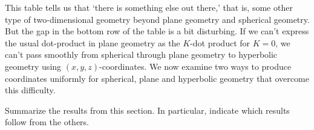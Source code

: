 \documentclass{ximera}
\begin{document}
This table tells us that `there is something else out there,' that is,
some other type of two-dimensional geometry beyond plane geometry and
spherical geometry. But the gap in the bottom row of the table is a
bit disturbing. If we can't express the usual dot-product in plane
geometry as the $K$-dot product for $K=0$, we can't pass smoothly from
spherical through plane geometry to hyperbolic geometry using
$(x,y,z)$-coordinates. We now examine two ways to produce coordinates
uniformly for spherical, plane and hyperbolic geometry that overcome
this difficulty.



\begin{problem}
Summarize the results from this section. In particular, indicate which
results follow from the others.
\begin{freeResponse}
\end{freeResponse}
\end{problem}
\end{document}
